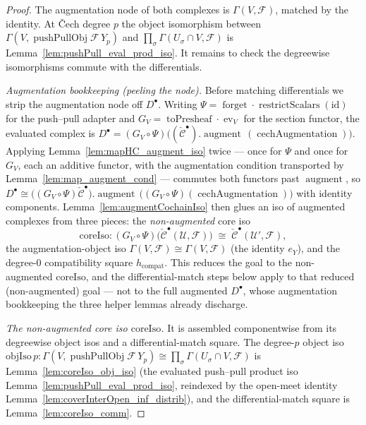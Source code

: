 \begin{proof}
  The augmentation node of both complexes is \(\Gamma(V, \mathcal{F})\), matched by the
  identity. At {\v C}ech degree \(p\) the object isomorphism between
  \(\Gamma(V, \operatorname{pushPullObj}\mathcal{F}\,Y_p)\) and \(\prod_\sigma \Gamma(U_\sigma
  \cap V, \mathcal{F})\) is Lemma~\ref{lem:pushPull_eval_prod_iso}. It remains to check the
  degreewise isomorphisms commute with the differentials.

  \emph{Augmentation bookkeeping (peeling the node).} Before matching differentials we strip the
  augmentation node off \(D^\bullet\). Writing \(\Psi = \operatorname{forget} \cdot
  \operatorname{restrictScalars}(\mathrm{id})\) for the push--pull adapter and \(G_V =
  \operatorname{toPresheaf} \cdot \operatorname{ev}_{V}\) for the section functor, the evaluated
  complex is \(D^\bullet = (G_V \circ \Psi)\bigl((\check{\mathcal{C}}^\bullet)
  .\operatorname{augment}\,(\operatorname{cechAugmentation})\bigr)\). Applying
  Lemma~\ref{lem:mapHC_augment_iso} twice --- once for \(\Psi\) and once for \(G_V\), each an
  additive functor, with the augmentation condition transported by
  Lemma~\ref{lem:map_augment_cond} --- commutes both functors past
  \(\operatorname{augment}\), so \(D^\bullet \cong \bigl((G_V \circ \Psi)
  \check{\mathcal{C}}^\bullet\bigr).\operatorname{augment}\,\bigl((G_V \circ \Psi)
  (\operatorname{cechAugmentation})\bigr)\) with identity components. Lemma~\ref{lem:augmentCochainIso}
  then glues an iso of augmented complexes from three pieces: the \emph{non-augmented} core iso
  \[
    \mathrm{coreIso} : (G_V \circ \Psi)\bigl(\check{\mathcal{C}}^\bullet(\mathcal{U},
      \mathcal{F})\bigr) \;\cong\; \check{\mathcal{C}}^\bullet(\mathcal{U}', \mathcal{F}),
  \]
  the augmentation-object iso \(\Gamma(V, \mathcal{F}) \cong \Gamma(V, \mathcal{F})\) (the
  identity \(e_Y\)), and the degree-\(0\) compatibility square \(h_{\mathrm{compat}}\). This
  reduces the goal to the non-augmented \(\mathrm{coreIso}\), and the differential-match steps
  below apply to that reduced (non-augmented) goal --- not to the full augmented \(D^\bullet\),
  whose augmentation bookkeeping the three helper lemmas already discharge.

  \emph{The non-augmented core iso \(\mathrm{coreIso}\).} It is assembled componentwise from
  its degreewise object isos and a differential-match square. The degree-\(p\) object iso
  \(\mathrm{objIso}\,p : \Gamma(V,
  \operatorname{pushPullObj}\mathcal{F}\,Y_p) \cong \prod_\sigma \Gamma(U_\sigma \cap V,
  \mathcal{F})\) is Lemma~\ref{lem:coreIso_obj_iso} (the evaluated push--pull product iso
  Lemma~\ref{lem:pushPull_eval_prod_iso}, reindexed by the open-meet identity
  Lemma~\ref{lem:coverInterOpen_inf_distrib}), and the differential-match square is
  Lemma~\ref{lem:coreIso_comm}.


\end{proof}
